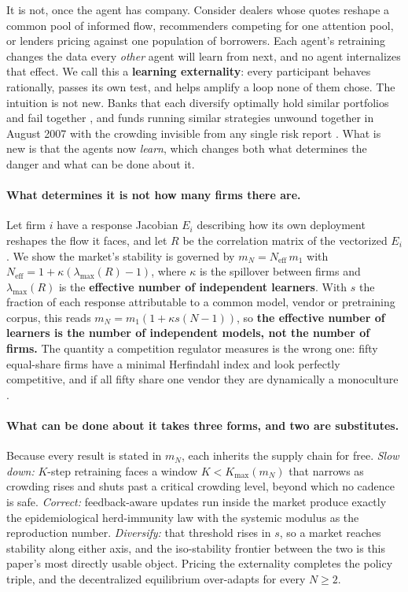 \documentclass{article}
\theoremstyle{plain}
\theoremstyle{definition}
\newcommand{\Neff}{N_{\mathrm{eff}}}
\newcommand{\mN}{m_N}
\newcommand{\lmax}{\lambda_{\max}}
\begin{document}
It is not, once the agent has company. Consider dealers whose quotes reshape a common pool of informed flow, recommenders competing for one attention pool, or lenders pricing against one population of borrowers. Each agent's retraining changes the data every \emph{other} agent will learn from next, and no agent internalizes that effect. We call this a \textbf{learning externality}: every participant behaves rationally, passes its own test, and helps amplify a loop none of them chose. The intuition is not new. Banks that each diversify optimally hold similar portfolios and fail together \citep{beale2011,wagner2010}, and funds running similar strategies unwound together in August 2007 with the crowding invisible from any single risk report \citep{khandani2007}. What is new is that the agents now \emph{learn}, which changes both what determines the danger and what can be done about it.

\paragraph{What determines it is not how many firms there are.}
Let firm $i$ have a response Jacobian $E_i$ describing how its own deployment reshapes the flow it faces, and let $R$ be the correlation matrix of the vectorized $E_i$. We show the market's stability is governed by $\mN = \Neff\, m_1$ with $\Neff = 1 + \kappa(\lmax(R)-1)$, where $\kappa$ is the spillover between firms and $\lmax(R)$ is the \textbf{effective number of independent learners}. With $s$ the fraction of each response attributable to a common model, vendor or pretraining corpus, this reads $\mN = m_1(1 + \kappa s (N-1))$, so \textbf{the effective number of learners is the number of independent models, not the number of firms.} The quantity a competition regulator measures is the wrong one: fifty equal-share firms have a minimal Herfindahl index and look perfectly competitive, and if all fifty share one vendor they are dynamically a monoculture \citep{hirschman1964}.

\paragraph{What can be done about it takes three forms, and two are substitutes.}
Because every result is stated in $\mN$, each inherits the supply chain for free. \emph{Slow down:} $K$-step retraining faces a window $K < K_{\max}(\mN)$ that narrows as crowding rises and shuts past a critical crowding level, beyond which no cadence is safe. \emph{Correct:} feedback-aware updates \citep{izzo2021} run inside the market produce exactly the epidemiological herd-immunity law with the systemic modulus as the reproduction number. \emph{Diversify:} that threshold rises in $s$, so a market reaches stability along either axis, and the iso-stability frontier between the two is this paper's most directly usable object. Pricing the externality completes the policy triple, and the decentralized equilibrium over-adapts for every $N \geq 2$.
\end{document}
